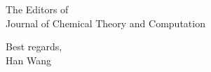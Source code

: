 \documentclass{letter}
\begin{document}
\begin{letter}{
    The Editors of\\
    Journal of Chemical Theory and Computation\\
    \vskip 1cm
  }

\vskip 1cm

Best regards,\\
Han Wang

\end{letter} 
\end{document}
